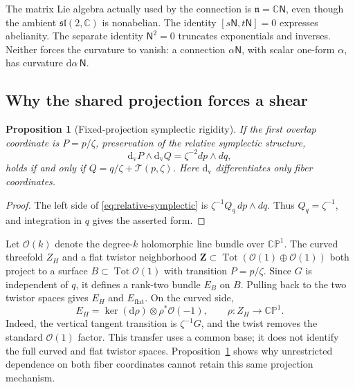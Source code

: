 \documentclass[11pt]{article}
\numberwithin{equation}{section}
\newtheorem{proposition}[theorem]{Proposition}
\theoremstyle{definition}
\theoremstyle{remark}
\newcommand{\C}{\mathbb C}
\newcommand{\CP}{\mathbb{CP}}
\newcommand{\OO}{\mathcal O}
\newcommand{\dd}{\mathrm d}
\newcommand{\Tot}{\operatorname{Tot}}
\newcommand{\NN}{\mathsf N}
\newcommand{\calT}{\mathcal T}
\newcommand{\flatZ}{\mathbf Z}
\begin{document}
The matrix Lie algebra actually used by the connection is $\mathfrak n=\C\NN$, even though the ambient $\mathfrak{sl}(2,\C)$ is nonabelian. The identity $[s\NN,t\NN]=0$ expresses abelianity. The separate identity $\NN^2=0$ truncates exponentials and inverses. Neither forces the curvature to vanish: a connection $\alpha\NN$, with scalar one-form $\alpha$, has curvature $\dd\alpha\,\NN$.

\subsection{Why the shared projection forces a shear}

\begin{proposition}[Fixed-projection symplectic rigidity]\label{prop:projection-rigidity}
If the first overlap coordinate is $P=p/\zeta$, preservation of the relative symplectic structure,
\begin{equation}\label{eq:relative-symplectic}
\dd_{\mathrm v}P\wedge\dd_{\mathrm v}Q
=\zeta^{-2}dp\wedge dq,
\end{equation}
holds if and only if $Q=q/\zeta+\calT(p,\zeta)$. Here $\dd_{\mathrm v}$ differentiates only fiber coordinates.
\end{proposition}
\begin{proof}
The left side of \eqref{eq:relative-symplectic} is $\zeta^{-1}Q_q\,dp\wedge dq$. Thus $Q_q=\zeta^{-1}$, and integration in $q$ gives the asserted form.
\end{proof}

Let $\OO(k)$ denote the degree-$k$ holomorphic line bundle over $\CP^1$. The curved threefold $Z_H$ and a flat twistor neighborhood $\flatZ\subset\Tot(\OO(1)\oplus\OO(1))$ both project to a surface $B\subset\Tot\OO(1)$ with transition $P=p/\zeta$. Since $G$ is independent of $q$, it defines a rank-two bundle $E_B$ on $B$. Pulling back to the two twistor spaces gives $E_H$ and $E_{\mathrm{flat}}$. On the curved side,
\begin{equation}\label{eq:twisted-vertical}
E_H=\ker(\dd\rho)\otimes\rho^*\OO(-1),
\qquad \rho:Z_H\to\CP^1.
\end{equation}
Indeed, the vertical tangent transition is $\zeta^{-1}G$, and the twist removes the standard $\OO(1)$ factor. This transfer uses a common base; it does not identify the full curved and flat twistor spaces. Proposition~\ref{prop:projection-rigidity} shows why unrestricted dependence on both fiber coordinates cannot retain this same projection mechanism.
\end{document}
